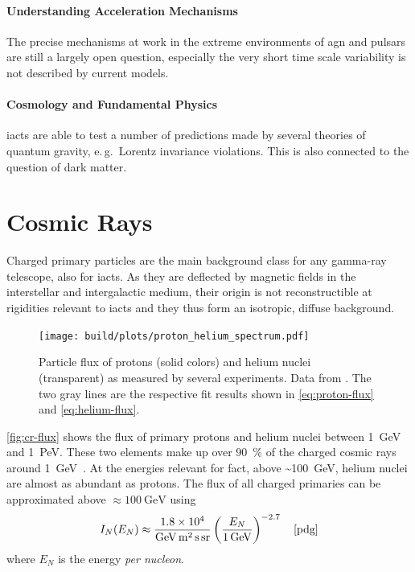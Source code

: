 \paragraph{Understanding Acceleration Mechanisms}
The precise mechanisms at work in the extreme environments of
\gls{agn} and pulsars are still a largely open question, 
especially the very short time scale variability is not described by current models.

\paragraph{Cosmology and Fundamental Physics}
\glspl{iact} are able to test a number of predictions made by 
several theories of quantum gravity, e.\,g.\ Lorentz invariance violations.
This is also connected to the question of dark matter.

\section{Cosmic Rays}\label{sec:cosmic-rays}
Charged primary particles are the main background class for any
gamma-ray telescope, also for \glspl{iact}.
As they are deflected by magnetic fields in the interstellar and
intergalactic medium, their origin is not reconstructible at rigidities 
relevant to \glspl{iact} and they thus form an isotropic, diffuse background.
\begin{figure}
  \centering
  \texttt{[image: build/plots/proton\_helium\_spectrum.pdf]}
  \caption{%
    Particle flux of protons (solid colors) and
    helium nuclei (transparent) as measured by several experiments.
    Data from \cite{cr-database}.
    The two gray lines are the respective fit results shown in \eqref{eq:proton-flux} and
    \eqref{eq:helium-flux}.
  }\label{fig:cr-flux}
\end{figure}

\autoref{fig:cr-flux} shows the flux of primary protons and helium nuclei between
\SI{1}{\GeV} and \SI{1}{\peta\eV}. 
These two elements make up over \SI{90}{\percent} of the charged cosmic rays
around \SI{1}{\GeV}~\cite{pdg}. 
At the energies relevant for \gls{fact}, above \textasciitilde\SI{100}{\GeV},
helium nuclei are almost as abundant as protons.
The flux of all charged primaries can be approximated above $\approx \SI{100}{\GeV}$
using
\begin{equation}
  I_N(E_N) \approx
  \frac{\num{1.8e4}}{\si{\GeV\meter\squared\second\steradian}}
  \left(\frac{E_N}{\SI{1}{\GeV}}\right)^{\num{-2.7}}
  \quad \text{\cite[(29.2)]{pdg}} \label{eq:all-particle}
\end{equation}
where $E_N$ is the energy \emph{per nucleon}.

